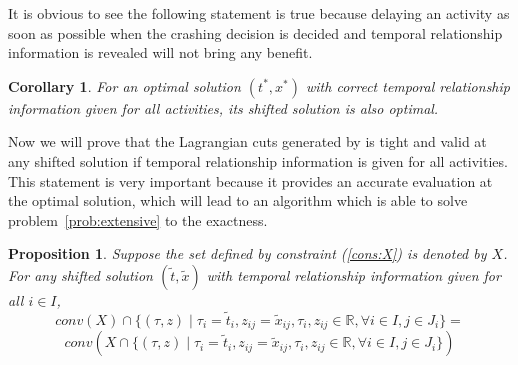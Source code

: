 \documentclass[11pt]{article}
\newtheorem{corollary}[theorem]{Corollary}
\newtheorem{proposition}[theorem]{Proposition}
\newcommand{\noi}{\noindent}
\begin{document}
	\newline
	It is obvious to see the following statement is true because delaying an activity as soon as possible when the crashing decision is decided and temporal relationship information is revealed will not bring any benefit.
	\begin{corollary}
		For an optimal solution \((t^*,x^*)\) with correct temporal relationship information given for all activities, its shifted solution is also optimal.
	\end{corollary}
	\noi Now we will prove that the Lagrangian cuts generated by \cite{zou2016nested} is tight and valid at any shifted solution if temporal relationship information is given for all activities. This statement is very important because it provides an accurate evaluation at the optimal solution, which will lead to an algorithm which is able to solve problem~\ref{prob:extensive} to the exactness.
	\begin{proposition} \label{prop:convex}
		Suppose the set defined by constraint (\ref{cons:X}) is denoted by \(X\). For any shifted solution \((\tilde{t},\tilde{x})\) with temporal relationship information given for all \( i \in I\), 
		\[conv(X) \cap \{(\tau,z) \mid \tau_i = \tilde{t}_i, z_{ij} = \tilde{x}_{ij}, \tau_i, z_{ij} \in \mathbb{R}, \forall i \in I, j \in J_i \}  = \]
		\[conv(X \cap \{(\tau,z) \mid \tau_i = \tilde{t}_i, z_{ij} = \tilde{x}_{ij}, \tau_i, z_{ij} \in \mathbb{R}, \forall i \in I, j \in J_i \} )\]
	\end{proposition}
\end{document}
